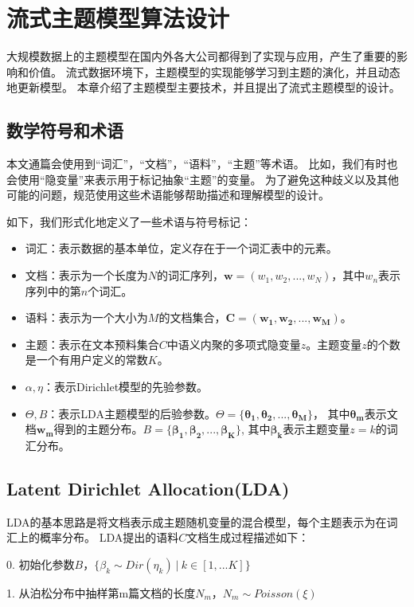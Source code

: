\chapter{流式主题模型算法设计}
\label{chapter:design}
大规模数据上的主题模型在国内外各大公司都得到了实现与应用，产生了重要的影响和价值。
流式数据环境下，主题模型的实现能够学习到主题的演化，并且动态地更新模型。
本章介绍了主题模型主要技术，并且提出了流式主题模型的设计。

\section{数学符号和术语}
本文通篇会使用到“词汇”，“文档”，“语料”，“主题”等术语。
比如，我们有时也会使用“隐变量”来表示用于标记抽象“主题”的变量。
为了避免这种歧义以及其他可能的问题，规范使用这些术语能够帮助描述和理解模型的设计。

如下，我们形式化地定义了一些术语与符号标记：
\begin{itemize}
\item 词汇：表示数据的基本单位，定义存在于一个词汇表中的元素。
\item 文档：表示为一个长度为$N$的词汇序列，$\mathbf{w}=(w_1, w_2, ..., w_N)$，其中$w_n$表示序列中的第$n$个词汇。
\item 语料：表示为一个大小为$M$的文档集合，$\mathbf{C=(w_1, w_2, ..., w_M)}$。
\item 主题：表示在文本预料集合$C$中语义内聚的多项式隐变量$z$。主题变量$z$的个数是一个有用户定义的常数$K$。
\item $\alpha, \eta$：表示Dirichlet模型的先验参数。
\item $\Theta, B$：表示LDA主题模型的后验参数。$\Theta=\mathbf{\{\theta_1, \theta_2, ...,\theta_M\}}$，
其中$\mathbf{\theta_m}$表示文档$\mathbf{w_m}$得到的主题分布。$B = \mathbf{ \{\beta_1, \beta_2, ...,\beta_K\}}$,
其中$\mathbf{\beta_k}$表示主题变量$z = k$的词汇分布。
\end{itemize}

\section{Latent Dirichlet Allocation(LDA)}
LDA的基本思路是将文档表示成主题随机变量的混合模型，每个主题表示为在词汇上的概率分布。
LDA提出的语料$C$文档生成过程描述如下：

0. 初始化参数$B$，$\{\beta_k \sim Dir(\eta_k)~ |~k \in [1, ... K]\}$

1. 从泊松分布中抽样第m篇文档的长度$N_m$，$N_m \sim Poisson(\xi)$

